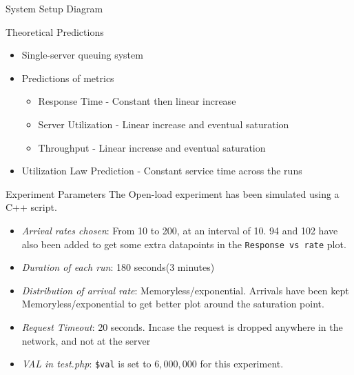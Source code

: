 \documentclass[10pt]{beamer}
\begin{document}
\begin{frame}{System Setup Diagram}
  \begin{center}
  \end{center}
\end{frame}

\begin{frame}{Theoretical Predictions}
    \begin{itemize}
        \item Single-server queuing system
        \item Predictions of metrics
        \begin{itemize}
            \item Response Time - Constant then linear increase
            \item Server Utilization - Linear increase and eventual saturation
            \item Throughput - Linear increase and eventual saturation
        \end{itemize}
        \item Utilization Law Prediction - Constant service time across the runs
    \end{itemize}
\end{frame}

\begin{frame}{Experiment Parameters}
    The Open-load experiment has been simulated using a C++ script. 
    \begin{itemize}
        \item \textit{Arrival rates chosen}: From 10 to 200, at an interval of 10. 94 and 102 have also been added to get some extra datapoints in the \texttt{Response vs rate} plot.
        \item \textit{Duration of each run}: 180 seconds(3 minutes)
        \item \textit{Distribution of arrival rate}: Memoryless/exponential. Arrivals have been kept Memoryless/exponential to get better plot around the saturation point.
        \item \textit{Request Timeout}: 20 seconds. Incase the request is dropped anywhere in the network, and not at the server
        \item \textit{VAL in test.php}: \texttt{\$val} is set to $6,000,000$ for this experiment.
    \end{itemize}
\end{frame}
\end{document}
